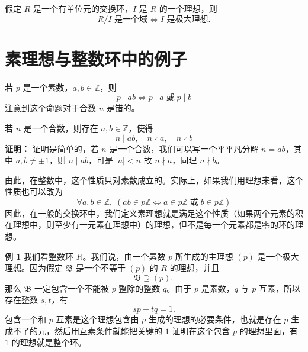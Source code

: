 \begin{theorem}[极大理想与域]
假定 $R$ 是一个有单位元的交换环，$I$ 是 $R$ 的一个理想，则
\[
R/I\text{ 是一个域}\iff I\text{ 是极大理想}.
\]
\end{theorem}

\section{素理想与整数环中的例子}

\begin{lemma}[引理 2.7：素数的性质]
若 $p$ 是一个素数，$a,b\in\mathbb{Z}$，则
\[
p\mid ab\iff p\mid a\;\text{或}\;p\mid b
\]
注意到这个命题对于合数 $n$ 是错的。
\end{lemma}

\begin{lemma}[引理 2.8：合数的性质]
若 $n$ 是一个合数，则存在 $a,b\in\mathbb{Z}$，使得
\[
n\mid ab,\quad n\nmid a,\quad n\nmid b
\]
\textbf{证明：} 证明是简单的，若 $n$ 是一个合数，我们可以写一个平平凡分解 $n=ab$，其中 $a,b\ne\pm1$，则 $n\mid ab$，可是 $|a|<n$ 故 $n\nmid a$，同理 $n\nmid b$。

由此，在整数中，这个性质只对素数成立的。实际上，如果我们用理想来看，这个性质也可以改为
\[
\forall a,b\in\mathbb{Z},\;(ab\in p\mathbb{Z}\iff a\in p\mathbb{Z}\;\text{或}\;b\in p\mathbb{Z})
\]
因此，在一般的交换环中，我们定义素理想就是满足这个性质（如果两个元素的积在理想中，则至少有一元素在理想中）的理想，但不是每一个元素都是零的环的理想。
\end{lemma}

\begin{example}
\textbf{例 1} \quad 我们看整数环 $R$。我们说，由一个素数 $p$ 所生成的主理想 $(p)$ 是一个极大理想。因为假定 $\mathfrak{B}$ 是一个不等于 $(p)$ 的 $R$ 的理想，并且
\[
\mathfrak{B}\supseteq(p),
\]
那么 $\mathfrak{B}$ 一定包含一个不能被 $p$ 整除的整数 $q$。由于 $p$ 是素数，$q$ 与 $p$ 互素，所以存在整数 $s,t$，有
\[
sp+tq=1.
\]
包含一个和 $p$ 互素是这个理想包含由 $p$ 生成的理想的必要条件，也就是存在 $p$ 生成不了的元，然后用互素条件就能把关键的 $1$ 证明在这个包含 $p$ 的理想里面，有 $1$ 的理想就是整个环。
\end{example}
